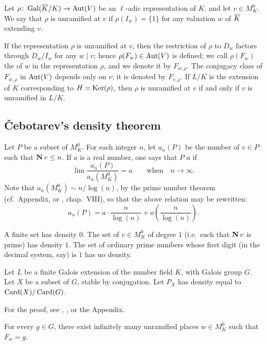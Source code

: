 \begin{mydef}
Let $\rho \colon \operatorname{Gal}(\overline{K}/K) \to \operatorname{Aut}(V)$ be an $\ell$-adic representation
of $K$, and let $v \in M_K^0$. We say that $\rho$ is unramified at $v$ if
$\rho(I_w) = \{ 1 \}$ for any valuation $w$ of $\overline{K}$ extending $v$.
\end{mydef}

If the representation $\rho$ is unramified at $v$, then the
\dpage
restriction of $\rho$ to $D_w$ factors through $D_w/I_w$ for any $w\mid v$;
hence $\rho(F_w) \in \operatorname{Aut}(V)$ is defined; we call $\rho(F_w)$ the
 of $w$ in the representation $\rho$, and we denote it by
$F_{w, \rho}$. The conjugacy class of $F_{w, \rho}$ in $\operatorname{Aut}(V)$ depends only
on $v$; it is denoted by $F_{v, \rho}$. If $L/K$ is the extension of $K$
corresponding to $H = \operatorname{Ker}(\rho)$, then $\rho$ is unramified at $v$ if and only
if $v$ is unramified in $L/K$.

\subsection{\v Cebotarev's density theorem}\label{sec:I_22}
Let $P$ be a subset of $M_K^0$. For each integer $n$, let $a_n(P)$
be the number of $v \in P$ such that $\operatorname{\mathbf{N}} v \le n$. If $a$ is a real number,
one says that $P$  $a$ if
\[
	\lim \frac{a_n(P)}{a_n(M_K^0)} = a \qquad \text{when}\quad n \to \infty.
\]
Note that $a_n(M_K^0) \sim n/\log(n)$, by the prime number theorem (cf.\
Appendix, or \cite{13}, chap.~VIII), so that the above relation may be
rewritten:
\[
	a_n(P) = a \cdot \frac{n}{\log(n)} + o \left(\frac{n}{\log(n)}\right).
\]
\begin{ex}
A finite set has density $0$. The set of $v \in M_K^0$ of degree $1$ (i.e.\ such
that $\operatorname{\mathbf{N}} v$ is prime) has density $1$. The set of ordinary prime numbers
whose first digit (in the decimal system, say) is $1$ has no density.
\end{ex}

\begin{thm}\label{thm-chebotarev}
Let $L$ be a finite Galois extension of the number field $K$, with Galois group
$G$. Let $X$ be a subset of $G$, stable by
\dpage
conjugation. Let $P_X$ has density equal to $\operatorname{Card}(X)/\operatorname{Card}(G)$. 
\end{thm}
For the proof, see \cite{7}, \cite{1}, or the Appendix.

\begin{cor}
For every $g \in G$, there exist infinitely many unramified places $w \in
M_K^0$ such that $F_w = g$.
\end{cor}

